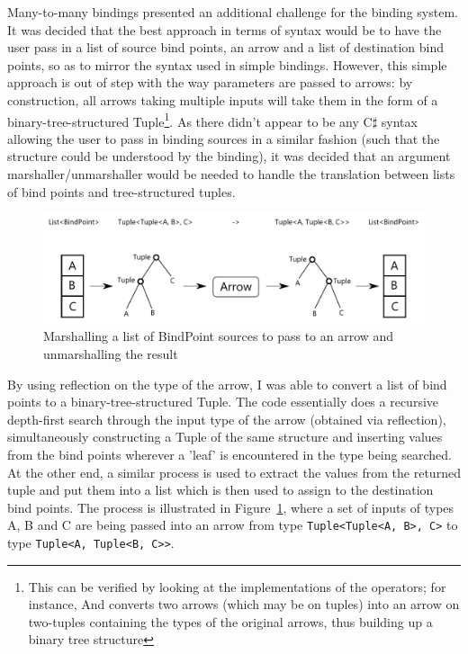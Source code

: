 \documentclass[12pt,twoside,notitlepage]{report}
\begin{document}
Many-to-many bindings presented an additional challenge for the binding system. It was decided that the best approach in terms of syntax would be to have the user pass in a list of source bind points, an arrow and a list of destination bind points, so as to mirror the syntax used in simple bindings. However, this simple approach is out of step with the way parameters are passed to arrows: by construction, all arrows taking multiple inputs will take them in the form of a binary-tree-structured Tuple\footnote{This can be verified by looking at the implementations of the operators; for instance, And converts two arrows (which may be on tuples) into an arrow on two-tuples containing the types of the original arrows, thus building up a binary tree structure}. As there didn't appear to be any C$\sharp$ syntax allowing the user to pass in binding sources in a similar fashion (such that the structure could be understood by the binding), it was decided that an argument marshaller/unmarshaller would be needed to handle the translation between lists of bind points and tree-structured tuples.

\begin{figure}[!ht]
  \centering
  \includegraphics[width=\textwidth]{fig/ArgumentMarshalling.pdf}
  \caption{Marshalling a list of BindPoint sources to pass to an arrow and unmarshalling the result}
  \label{fig:argument_marshalling}
\end{figure}

By using reflection on the type of the arrow, I was able to convert a list of bind points to a binary-tree-structured Tuple. The code essentially does a recursive depth-first search through the input type of the arrow (obtained via reflection), simultaneously constructing a Tuple of the same structure and inserting values from the bind points wherever a 'leaf' is encountered in the type being searched. At the other end, a similar process is used to extract the values from the returned tuple and put them into a list which is then used to assign to the destination bind points. The process is illustrated in Figure~\ref{fig:argument_marshalling}, where a set of inputs of types A, B and C are being passed into an arrow from type \texttt{Tuple<Tuple<A, B>, C>} to type \texttt{Tuple<A, Tuple<B, C>>}.
\end{document}
